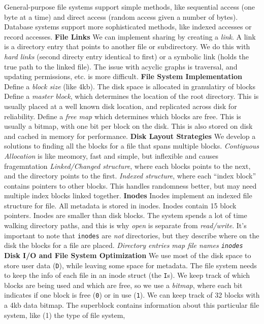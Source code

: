 General-purpose file systems support simple methods, like sequential
access (one byte at a time) and direct access (random access given a
number of bytes).
Database systems support more sophisticated methods, like indexed
accesses or record accesses.
{\bf File Links}
We can implement sharing by creating a \emph{link}. A link is a
directory entry that points to another file or subdirectory. We do this
with \emph{hard links} (second directy entry identical to first) or a
symbolic link (holds the true path to the linked file).
The issue with acyclic graphs is traversal, and updating permissions,
etc. is more difficult.
{\bf File System Implementation}
Define a \emph{block size} (like 4kb). The disk space is allocated in
granulatiry of blocks
Define a \emph{master block}, which determines the location of the root
directory. This is usually placed at a well known disk location, and
replicated across disk for reliability.
Define a \emph{free map} which determines which blocks are free. This is
usually a bitmap, with one bit per block on the disk. This is also
stored on disk and cached in memory for performance.
{\bf Disk Layout Strategies}
We develop a solutions to finding all the blocks for a file that spans multiple
blocks.  \emph{Contiguous Allocation} is like meomory, fast and simple, but
inflexible and causes fragemntation \emph{Linked/Changed structure}, where each
blocks points to the next, and the directory points to the first.
\emph{Indexed structure}, where each ``index block'' contains pointers to other
blocks. This handles randomness better, but may need multiple index blocks
linked together.
{\bf Inodes}
Inodes implement an indexed file structure for file.
All metadata is stored in inodes.
Inodes contain 15 block pointers.
Inodes are smaller than disk blocks.
The system spends a lot of time walking directory paths, and this is why
\emph{open} is separate from \emph{read/write}.
It's important to note that \texttt{inodes} are \emph{not} directories,
but they describe where on the disk the blocks for a file are placed.
\emph{Directory entries map file names \texttt{inodes}}
{\bf Disk I/O and File System
Optimization}
We use most of the disk space to store user data (\texttt{D}), while
leaving some space for metadata.
The file system needs to keep the info of each file in an inode struct
(the \texttt{I}s).
We keep track of which blocks are being used and which are free, so we
use a \emph{bitmap}, where each bit indicates if one block is free
(\texttt{0}) or in use (\texttt{1}). We can keep track of 32 blocks with
a 4kb data bitmap.
The superblock contains information about this particular file system, like (1) the type of file system,
